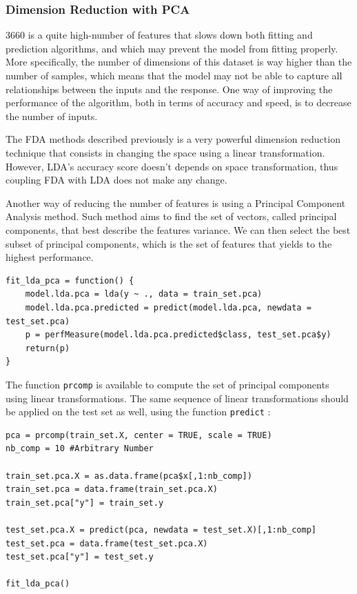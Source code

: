 \documentclass[]{report}
\begin{document}
\subsubsection{Dimension Reduction with PCA}
3660 is a quite high-number of features that slows down both fitting and prediction algorithms, and which may prevent the model from fitting properly. More specifically, the number of dimensions of this dataset is way higher than the number of samples, which means that the model may not be able to capture all relationships between the inputs and the response. One way of improving the performance of the algorithm, both in terms of accuracy and speed, is to decrease the number of inputs.

The FDA methods described previously is a very powerful dimension reduction technique that consists in changing the space using a linear transformation. However, LDA's accuracy score doesn't depends on space transformation, thus coupling FDA with LDA does not make any change.

Another way of reducing the number of features is using a Principal Component Analysis method. Such method aims to find the set of vectors, called principal components, that best describe the features variance. We can then select the best subset of principal components, which is the set of features that yields to the highest performance.

\begin{lstlisting}
fit_lda_pca = function() {
	model.lda.pca = lda(y ~ ., data = train_set.pca)
	model.lda.pca.predicted = predict(model.lda.pca, newdata = test_set.pca)
	p = perfMeasure(model.lda.pca.predicted$class, test_set.pca$y)
	return(p)
}

\end{lstlisting}

The function \texttt{prcomp} is available to compute the set of principal components using linear transformations. The same sequence of linear transformations should be applied on the test set as well, using the function \texttt{predict} : 
\begin{lstlisting}
pca = prcomp(train_set.X, center = TRUE, scale = TRUE)
nb_comp = 10 #Arbitrary Number

train_set.pca.X = as.data.frame(pca$x[,1:nb_comp])
train_set.pca = data.frame(train_set.pca.X)
train_set.pca["y"] = train_set.y

test_set.pca.X = predict(pca, newdata = test_set.X)[,1:nb_comp]
test_set.pca = data.frame(test_set.pca.X)
test_set.pca["y"] = test_set.y

fit_lda_pca()
\end{lstlisting}
\end{document}

